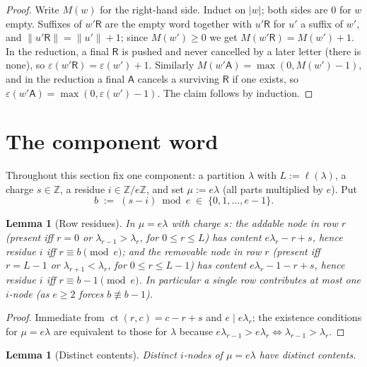 \documentclass[11pt]{article}
\newtheorem{lemma}[theorem]{Lemma}
\theoremstyle{definition}
\newcommand{\ZZ}{\mathbb{Z}}
\newcommand{\eps}{\varepsilon}
\newcommand{\Aa}{{\mathsf A}}
\newcommand{\Rr}{{\mathsf R}}
\newcommand{\ct}{\operatorname{ct}}
\begin{document}
\begin{proof}
Write $M(w)$ for the right-hand side. Induct on $|w|$; both sides are $0$
for $w$ empty. Suffixes of $w'\Rr$ are the empty word together with
$u'\Rr$ for $u'$ a suffix of $w'$, and $\|u'\Rr\| = \|u'\| + 1$; since
$M(w') \ge 0$ we get $M(w'\Rr) = M(w') + 1$. In the reduction, a final
$\Rr$ is pushed and never cancelled by a later letter (there is none), so
$\eps(w'\Rr) = \eps(w') + 1$. Similarly
$M(w'\Aa) = \max(0, M(w') - 1)$, and in the reduction a final $\Aa$
cancels a surviving $\Rr$ if one exists, so
$\eps(w'\Aa) = \max(0, \eps(w') - 1)$. The claim follows by induction.
\end{proof}

\section{The component word}\label{sec:component}

Throughout this section fix one component: a partition $\lambda$ with
$L := \ell(\lambda)$, a charge $s \in \ZZ$, a residue $i \in \ZZ/e\ZZ$, and
set $\mu := e\lambda$ (all parts multiplied by $e$). Put
\[
  b \;:=\; (s - i) \bmod e \;\in\; \{0,1,\dots,e-1\}.
\]

\begin{lemma}[Row residues]\label{lem:rows}
In $\mu = e\lambda$ with charge $s$:
the addable node in row $r$ (present iff $r = 0$ or
$\lambda_{r-1} > \lambda_r$, for $0 \le r \le L$) has content
$e\lambda_r - r + s$, hence residue $i$ iff $r \equiv b \pmod e$; and the
removable node in row $r$ (present iff $r = L-1$ or
$\lambda_{r+1} < \lambda_r$, for $0 \le r \le L-1$) has content
$e\lambda_r - 1 - r + s$, hence residue $i$ iff $r \equiv b - 1 \pmod e$.
In particular a single row contributes at most one $i$-node
(as $e \ge 2$ forces $b \not\equiv b-1$).
\end{lemma}

\begin{proof}
Immediate from $\ct(r,c) = c - r + s$ and $e \mid e\lambda_r$; the
existence conditions for $\mu = e\lambda$ are equivalent to those for
$\lambda$ because $e\lambda_{r-1} > e\lambda_r \Leftrightarrow \lambda_{r-1} > \lambda_r$.
\end{proof}

\begin{lemma}[Distinct contents]\label{lem:distinct}
Distinct $i$-nodes of $\mu = e\lambda$ have distinct contents.
\end{lemma}
\end{document}
